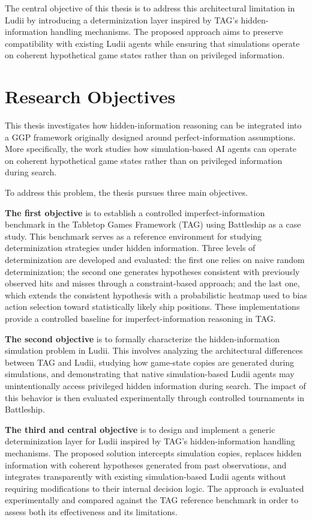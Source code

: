 The central objective of this thesis is to address this architectural limitation in Ludii by introducing a determinization layer inspired by TAG’s hidden-information handling mechanisms. The proposed approach aims to preserve compatibility with existing Ludii agents while ensuring that simulations operate on coherent hypothetical game states rather than on privileged information.

\section{Research Objectives}
This thesis investigates how hidden-information reasoning can be integrated into a GGP framework originally designed around perfect-information assumptions. More specifically, the work studies how simulation-based AI agents can operate on coherent hypothetical game states rather than on privileged information during search.

To address this problem, the thesis pursues three main objectives.

\textbf{The first objective} is to establish a controlled imperfect-information benchmark in the Tabletop Games Framework (TAG) using Battleship as a case study. This benchmark serves as a reference environment for studying determinization strategies under hidden information. Three levels of determinization are developed and evaluated: the first one relies on naive random determinization; the second one generates hypotheses consistent with previously observed hits and misses through a constraint-based approach; and the last one, which extends the consistent hypothesis with a probabilistic heatmap used to bias action selection toward statistically likely ship positions. These implementations provide a controlled baseline for imperfect-information reasoning in TAG.

\textbf{The second objective} is to formally characterize the hidden-information simulation problem in Ludii. This involves analyzing the architectural differences between TAG and Ludii, studying how game-state copies are generated during simulations, and demonstrating that native simulation-based Ludii agents may unintentionally access privileged hidden information during search. The impact of this behavior is then evaluated experimentally through controlled tournaments in Battleship.

\textbf{The third and central objective} is to design and implement a generic determinization layer for Ludii inspired by TAG’s hidden-information handling mechanisms. The proposed solution intercepts simulation copies, replaces hidden information with coherent hypotheses generated from past observations, and integrates transparently with existing simulation-based Ludii agents without requiring modifications to their internal decision logic\cite{piette2021ludii_logic}. The approach is evaluated experimentally and compared against the TAG reference benchmark in order to assess both its effectiveness and its limitations.
 
